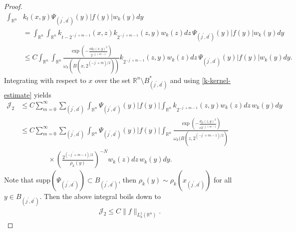 \documentclass[11pt, reqno]{amsproc}
\theoremstyle{definition}
\theoremstyle{remark}
\numberwithin{equation}{section}
\begin{document}
\begin{proof}
\begin{align*}
    \int_{\mathbb{R}^n} & k_t(x,y)\Psi_{(j^\prime, d^\prime)}(y)|f(y)|w_k(y)dy \\
    & =  \int_{\mathbb{R}^n}  \int_{\mathbb{R}^n} k_{t-2^{-j^\prime+m-1}}(x,z) k_{2^{-j^\prime+m-1}}(z,y)w_k(z)dz\, \Psi_{(j^\prime,d^\prime)}(y)|f(y)|w_k(y)dy\\
    & \leq C \int_{\mathbb{R}^n}  \int_{\mathbb{R}^n} \frac{\exp \left(-\frac{cd_\mathcal{O}(x,y)^2}{2^{-j^\prime+m-1}} \right)}{\omega_k \left(B(x,2^{(-j^\prime+m)/2})  \right)} k_{2^{-j^\prime+m-1}}(z,y)w_k(z)dz\, \Psi_{(j^\prime,d^\prime)}(y)|f(y)|w_k(y)dy.
\end{align*} 
Integrating with respect to $x$ over the set $\mathbb{R}^n \setminus B_{(j^\prime, d^\prime)}^*$ and using \eqref{k-kernel-estimate} yields
\begin{align*}
    \mathcal{J}_2  & \leq C \sum_{m=0}^\infty \sum_{(j^\prime, d^\prime)} \int_{\mathbb{R}^n} \Psi_{(j^\prime, d^\prime)}(y)|f(y)|\int_{\mathbb{R}^n} k_{2^{-j^\prime+m-1}}(z,y)w_k(z)dz\, w_k(y)dy \\
    & \leq C \sum_{m=0}^\infty \sum_{(j^\prime, d^\prime)} \int_{\mathbb{R}^n} \Psi_{(j^\prime, d^\prime)}(y)|f(y)|\int_{\mathbb{R}^n}  \frac{\exp\left(-\frac{d_\mathcal{O}(z,y)^2}{c2^{-j^\prime+m-1}} \right)}{\omega_k(B(z,2^{(-j^\prime+m-1)/2})} \\
    & \quad \quad \quad \quad\times \left(  \frac{2^{(-j^\prime+m-1)/2}}{\rho_k(y)} \right)^{-N}w_k(z)dz\, w_k(y)dy. 
\end{align*} Note that supp$\left(\Psi_{(j^\prime, d^\prime)}\right) \subset B_{(j^\prime, d^\prime)}$, then  $\rho_k(y) \sim \rho_k(x_{(j^\prime,d^\prime)})$ for all $y\in B_{(j^\prime, d^\prime)}$. Then the above integral boils down to 
\begin{align*}
     \mathcal{J}_2 \leq C\|f\|_{L_k^1(\mathbb{R}^n)}.
\end{align*}
\end{proof}
\end{document}
